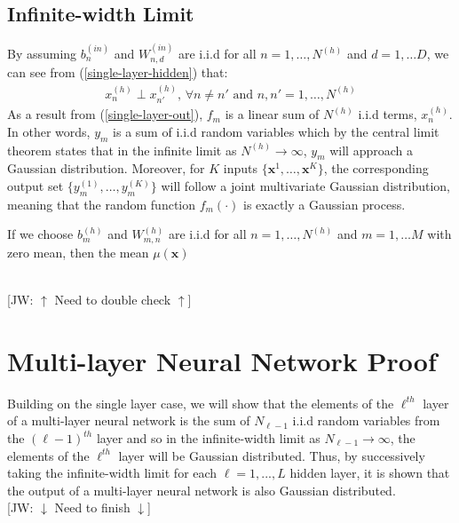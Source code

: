 \documentclass[twoside,11pt]{article}
\newcommand{\jw}[1]{{\color{gray} [JW: #1]}}
\begin{document}
\subsection{Infinite-width Limit}
By assuming $b_n^{(in)}$ and $W_{n, d}^{(in)}$ are i.i.d for all $n=1,\dots, N^{(h)}$ and $d = 1, \dots D$, we can see from (\ref{single-layer-hidden}) that:
\begin{align}
    x_{n}^{(h)} \perp x_{n'}^{(h)} \text{, } \forall n \neq n' \text{ and } n, n' = 1, \dots, N^{(h)} 
\end{align}
As a result from (\ref{single-layer-out}), $f_m$ is a linear sum of $N^{(h)}$ i.i.d terms, $x_{n}^{(h)}$. In other words, $y_m$ is a sum of i.i.d random variables which by the central limit theorem states that in the infinite limit as $N^{(h)} \rightarrow \infty$, $y_m$ will approach a Gaussian distribution. Moreover, for $K$ inputs $\{\textbf{x}^1, \dots, \textbf{x}^K\}$, the corresponding output set $\{y_m^{(1)}, \dots, y_m^{(K)}\}$ will follow a joint multivariate Gaussian distribution, meaning that the random function $f_m(\cdot)$ is exactly a Gaussian process.

If we choose $b_m^{(h)}$ and $W_{m, n}^{(h)}$ are i.i.d for all $n=1,\dots, N^{(h)}$ and $m = 1, \dots M$ with zero mean, then the mean $\mu(\textbf{x})$

\\\jw{$\uparrow$ Need to double check $\uparrow$}


\section{Multi-layer Neural Network Proof \cite{lee2018deep}}
Building on the single layer case, we will show that the elements of the $\ell^{th}$ layer of a multi-layer neural network is the sum of $N_{\ell-1}$ i.i.d random variables from the  $(\ell-1)^{th}$ layer and so in the infinite-width limit as $N_{\ell-1} \rightarrow \infty$, the elements of the $\ell^{th}$ layer will be Gaussian distributed. Thus, by successively taking the infinite-width limit for each $\ell=1,...,L$ hidden layer, it is shown that the output of a multi-layer neural network is also Gaussian distributed.
\\\jw{$\downarrow$ Need to finish $\downarrow$}
\end{document}
